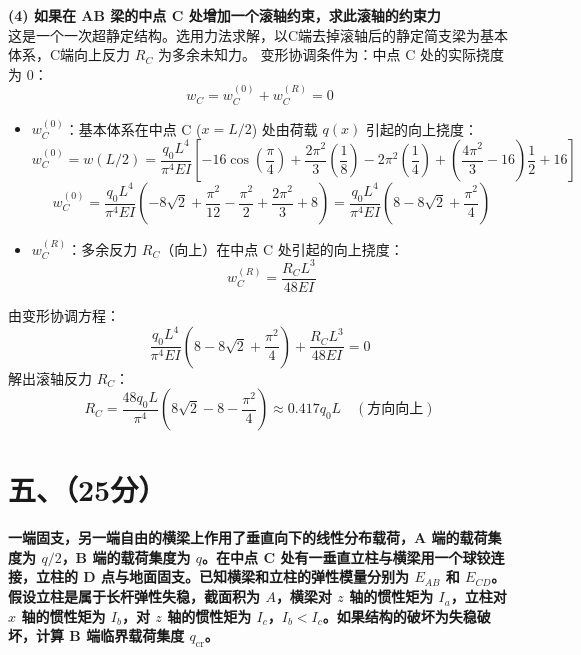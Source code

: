 \documentclass[11pt,a4paper]{ctexrep}
\begin{document}
{\textbf{(4) 如果在 AB 梁的中点 C 处增加一个滚轴约束，求此滚轴的约束力} \\
这是一个一次超静定结构。选用力法求解，以C端去掉滚轴后的静定简支梁为基本体系，C端向上反力 $R_C$ 为多余未知力。
变形协调条件为：中点 C 处的实际挠度为 0：
\[
    w_C = w_C^{(0)} + w_C^{(R)} = 0
\]
\begin{itemize}
    \item $w_C^{(0)}$：基本体系在中点 C ($x = L/2$) 处由荷载 $q(x)$ 引起的向上挠度：
          \[
              w_C^{(0)} = w(L/2) = \frac{q_0 L^4}{\pi^4 EI} \left[ -16 \cos\left(\frac{\pi}{4}\right) + \frac{2\pi^2}{3}\left(\frac{1}{8}\right) - 2\pi^2\left(\frac{1}{4}\right) + \left(\frac{4\pi^2}{3} - 16\right)\frac{1}{2} + 16 \right]
          \]
          \[
              w_C^{(0)} = \frac{q_0 L^4}{\pi^4 EI} \left( -8\sqrt{2} + \frac{\pi^2}{12} - \frac{\pi^2}{2} + \frac{2\pi^2}{3} + 8 \right) = \frac{q_0 L^4}{\pi^4 EI} \left( 8 - 8\sqrt{2} + \frac{\pi^2}{4} \right)
          \]
    \item $w_C^{(R)}$：多余反力 $R_C$（向上）在中点 C 处引起的向上挠度：
          \[
              w_C^{(R)} = \frac{R_C L^3}{48 EI}
          \]
\end{itemize}
由变形协调方程：
\[
    \frac{q_0 L^4}{\pi^4 EI} \left( 8 - 8\sqrt{2} + \frac{\pi^2}{4} \right) + \frac{R_C L^3}{48 EI} = 0
\]
解出滚轴反力 $R_C$：
\[
    R_C = \frac{48 q_0 L}{\pi^4} \left( 8\sqrt{2} - 8 - \frac{\pi^2}{4} \right) \approx 0.417 q_0 L \quad (\text{方向向上})
\]




\section*{五、（25分）}

\textbf{一端固支，另一端自由的横梁上作用了垂直向下的线性分布载荷，A 端的载荷集度为 $q/2$，B 端的载荷集度为 $q$。在中点 C 处有一垂直立柱与横梁用一个球铰连接，立柱的 D 点与地面固支。已知横梁和立柱的弹性模量分别为 $E_{AB}$ 和 $E_{CD}$。假设立柱是属于长杆弹性失稳，截面积为 $A$，横梁对 $z$ 轴的惯性矩为 $I_a$，立柱对 $x$ 轴的惯性矩为 $I_b$，对 $z$ 轴的惯性矩为 $I_c$，$I_b < I_c$。如果结构的破坏为失稳破坏，计算 B 端临界载荷集度 $q_{\text{cr}}$。}

\begin{center}
\end{center}}
\end{document}
